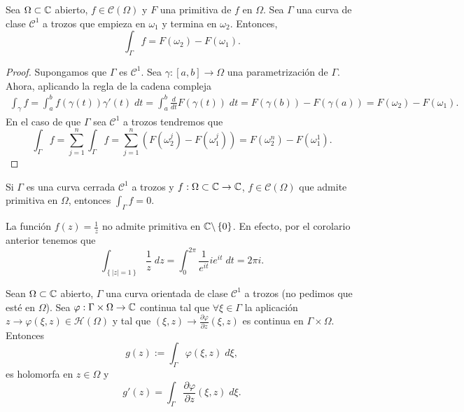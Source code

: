 \begin{theorem}
Sea $\displaystyle \Omega\subset \mathbb{C} $ abierto, $\displaystyle f \in \mathcal{C}\left(\Omega \right) $ y $\displaystyle F $ una primitiva de $\displaystyle f $ en $\displaystyle \Omega  $. Sea $\displaystyle \Gamma $ una curva de clase $\displaystyle \mathcal{C}^{1} $ a trozos que empieza en $\displaystyle \omega_{1} $ y termina en $\displaystyle \omega_{2} $. Entonces,
\[\int _{\Gamma }f =F\left(\omega_{2}\right)-F\left(\omega_{1}\right) .\]
\end{theorem}
\begin{proof}
	Supongamos que $\displaystyle \Gamma $ es $\displaystyle \mathcal{C}^{1} $. Sea $\displaystyle \gamma : \left[a,b\right] \to \Omega $ una parametrización de $\displaystyle \Gamma  $. Ahora, aplicando la regla de la cadena compleja 
	\[
	\begin{split}
	\int _{\gamma }f =\int^{b}_{a} f\left(\gamma\left(t\right)\right)\gamma'\left(t\right) \; dt= \int^{b}_{a} \frac{d}{dt}F\left(\gamma\left(t\right)\right) \; dt = F\left(\gamma\left(b\right)\right)-F\left(\gamma\left(a\right)\right)=F\left(\omega_{2}\right)-F\left(\omega_{1}\right) .
	\end{split}
	\]
En el caso de que $\displaystyle \Gamma $ sea $\displaystyle \mathcal{C}^{1} $ a trozos tendremos que 
\[\int _{\Gamma}f =\sum^{n}_{j = 1}\int _{\Gamma }f =\sum^{n}_{j = 1}\left(F\left(\omega_{2}^{j}\right)-F\left(\omega^{j}_{1}\right)\right) = F\left(\omega_{2}^{n}\right)-F\left(\omega_{1}^{1}\right) .\]
\end{proof}
\begin{colorary}
Si $\displaystyle \Gamma $ es una curva cerrada $\displaystyle \mathcal{C}^{1} $ a trozos y $\displaystyle f : \Omega\subset \mathbb{C} \to \mathbb{C} $, $\displaystyle f \in \mathcal{C}\left(\Omega \right) $ que admite primitiva en $\displaystyle \Omega  $, entonces $\displaystyle \int _{\Gamma }f =0 $. 
\end{colorary}
\begin{eg}
	La función $\displaystyle f\left(z\right)=\frac{1}{z} $ no admite primitiva en $\displaystyle \mathbb{C}\backslash \left\{ 0\right\}  $. En efecto, por el corolario anterior tenemos que 
	\[\int _{ \left\{ \left|z\right| = 1\right\} }\frac{1}{z} \; dz = \int^{2\pi }_{0} \frac{1}{e^{it}}ie^{it} \; dt =2\pi i .\]
\end{eg}
\begin{theorem}
Sean $\displaystyle \Omega\subset \mathbb{C} $ abierto, $\displaystyle \Gamma $ una curva orientada de clase $\displaystyle \mathcal{C}^{1} $ a trozos (no pedimos que esté en $\displaystyle \Omega  $). Sea $\displaystyle \varphi : \Gamma \times \Omega \to \mathbb{C} $ continua tal que $\displaystyle \forall \xi \in \Gamma  $ la aplicación $\displaystyle z \to \varphi\left(\xi, z\right)\in \mathcal{H}\left(\Omega \right) $ y tal que $\displaystyle \left(\xi, z\right)\to \frac{\partial \varphi}{\partial z}\left(\xi, z\right) $ es continua en $\displaystyle \Gamma \times \Omega  $.
Entonces
\[g\left(z\right):= \int _{\Gamma}\varphi\left(\xi, z\right) \; d\xi ,\]
es holomorfa en $\displaystyle z \in \Omega  $ y 
\[g'\left(z\right)=\int _{\Gamma}\frac{\partial\varphi}{\partial z}\left(\xi, z\right) \; d\xi .\]
\end{theorem}
